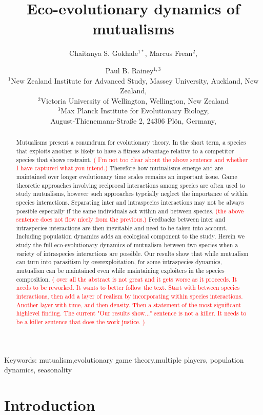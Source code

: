 \documentclass[12pt]{article}
\title{\vspace*{-22mm}\bf Eco-evolutionary dynamics of mutualisms}
\author{Chaitanya S. Gokhale$^{1*}$,
Marcus Frean$^{2}$,
 \and Paul B. Rainey$^{1,3}$ \\
\normalsize $^{1}$New Zealand Institute for Advanced Study, Massey University, Auckland, New Zealand, \\
\normalsize $^2$Victoria University of Wellington, Wellington, New Zealand\\
\normalsize $^3$Max Planck Institute for Evolutionary Biology, \\
\normalsize August-Thienemann-Stra{\ss}e 2, 24306 Pl\"{o}n, Germany,\\
}
\date{}
\newcommand{\paul}[1]{\textcolor{red}{(#1)}}
\begin{document}
\maketitle

\begin{abstract}
Mutualisms present a conundrum for evolutionary theory.
In the short term, a species that exploits another is likely to have a fitness advantage relative to a competitor species that shows restraint.  
\paul{ I'm not too clear about the above sentence and whether I have captured what you intend.}
Therefore how mutualisms emerge and are maintained over longer evolutionary time scales remains an important issue.
Game theoretic approaches involving reciprocal interactions among species are often used to study mutualisms, however such approaches typcially neglect the importance of within species interactions.
Separating inter and intraspecies interactions may not be always possible especially if the same individuals act within and between species.
\paul{the above sentence does not flow nicely from the previous.}
Feedbacks between inter and intraspecies interactions are then inevitable and need to be taken into account.
Including population dynamics adds an ecological component to the study.
Herein we study the full eco-evolutionary dynamics of mutualism between two species when a variety of  intraspecies interactions are possible.
Our results show that while mutualism can turn into parasitism by overexploitation, for some intraspecies dynamics, mutualism can be maintained even while maintaining exploiters in the species composition.
\paul{ over all the abstract is not great and it gets worse as it proceeds.  It needs to be reworked. It wants to better follow the text.  Start with between species interactions,  then add a layer of realism by incorporating within species interactions.  Another layer with time, and then density.  Then a statement of the most significant highlevel finding.  The current "Our results show..." sentence is not a killer.  It needs to be a killer sentence that does the work justice. }

\end{abstract}

\noindent
Keywords: mutualism,evolutionary game theory,multiple players, population dynamics, seasonality

\tableofcontents

\section{Introduction}
\end{document}
